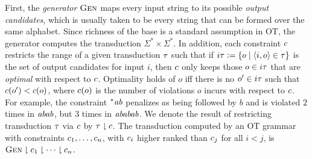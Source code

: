 First, the \emph{generator} $\textsc{Gen}$ maps every input string to its possible \emph{output candidates}, which is usually taken to be every string that can be formed over the same alphabet.
Since richness of the base is a standard assumption in OT, the generator computes the transduction $\Sigma^* \times \Sigma^*$.
In addition, each constraint $c$ restricts the range of a given transduction $\tau$ such that if $i\tau \mathrel{\mathop:}= \left \{  o \mid \left \langle i,o \right \rangle  \in \tau  \right \}$ is the set of output candidates for input $i$, then $c$ only keeps those $o \in i\tau$ that are \emph{optimal} with respect to $c$.
Optimality holds of $o$ iff there is no $o' \in i\tau$ such that $c(o') < c(o)$, where $c(o)$ is the number of violations $o$ incurs with respect to $c$.
For example, the constraint $^*\mathit{ab}$ penalizes $a$s being followed by $b$ and is violated $2$ times in $\mathit{abab}$, but $3$ times in $\mathit{ababab}$.
We denote the result of restricting transduction $\tau$ via $c$ by $\tau \downharpoonright c$.
The transduction computed by an OT grammar with constraints $c_1, \ldots, c_n$, with $c_i$ higher ranked than $c_j$ for all $i < j$, is $\textsc{Gen} \downharpoonright c_1 \downharpoonright \cdots \downharpoonright c_n$.
%
